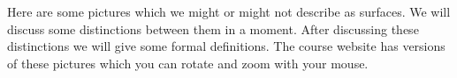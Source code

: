 \documentclass[reqno]{amsart}
\theoremstyle{definition}
\begin{document}
Here are some pictures which we might or might not describe as
surfaces.  We will discuss some distinctions between them in a moment.
After discussing these distinctions we will give some formal
definitions.  The course website has versions of these pictures which
you can rotate and zoom with your mouse.
\begin{center}
\end{center}
\end{document}
